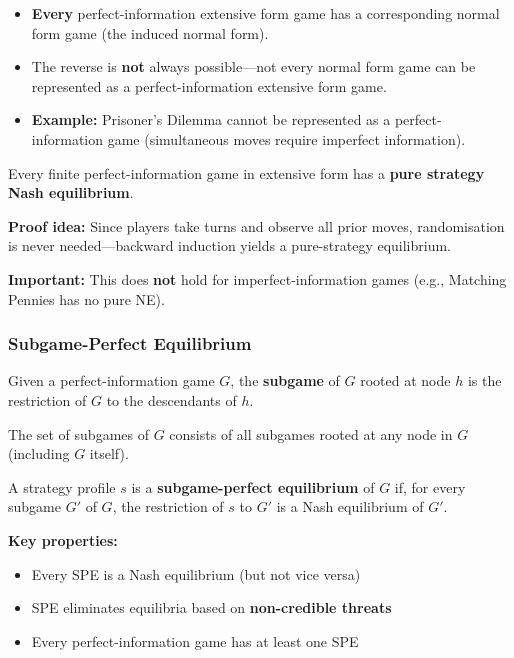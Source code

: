 \begin{thmbox}
\begin{itemize}
  \item \textbf{Every} perfect-information extensive form game has a corresponding normal form game (the induced normal form).
  \item The reverse is \textbf{not} always possible---not every normal form game can be represented as a perfect-information extensive form game.
  \item \textbf{Example:} Prisoner's Dilemma cannot be represented as a perfect-information game (simultaneous moves require imperfect information).
\end{itemize}
\end{thmbox}

\begin{thmbox}
Every finite perfect-information game in extensive form has a \textbf{pure strategy Nash equilibrium}.

\textbf{Proof idea:} Since players take turns and observe all prior moves, randomisation is never needed---backward induction yields a pure-strategy equilibrium.

\textbf{Important:} This does \textbf{not} hold for imperfect-information games (e.g., Matching Pennies has no pure NE).
\end{thmbox}

\bigseparator

\subsubsection{Subgame-Perfect Equilibrium}

\begin{defbox}[Subgame]
Given a perfect-information game $G$, the \textbf{subgame} of $G$ rooted at node $h$ is the restriction of $G$ to the descendants of $h$.

The set of subgames of $G$ consists of all subgames rooted at any node in $G$ (including $G$ itself).
\end{defbox}

\begin{defbox}
A strategy profile $s$ is a \textbf{subgame-perfect equilibrium} of $G$ if, for every subgame $G'$ of $G$, the restriction of $s$ to $G'$ is a Nash equilibrium of $G'$.

\textbf{Key properties:}
\begin{itemize}
  \item Every SPE is a Nash equilibrium (but not vice versa)
  \item SPE eliminates equilibria based on \textbf{non-credible threats}
  \item Every perfect-information game has at least one SPE
\end{itemize}
\end{defbox}

